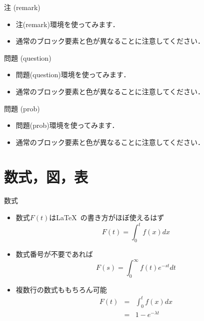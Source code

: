\begin{frame}{注 (remark)}
  \begin{remark}
    \begin{itemize}
      \item 注(remark)環境を使ってみます．
      \item 通常のブロック要素と色が異なることに注意してください．
    \end{itemize}
  \end{remark}
\end{frame}

\begin{frame}{問題 (question)}
  \begin{question}
    \begin{itemize}
      \item 問題(question)環境を使ってみます．
      \item 通常のブロック要素と色が異なることに注意してください．
    \end{itemize}
  \end{question}
\end{frame}

\begin{frame}{問題 (prob)}
  \begin{prob}
    \begin{itemize}
      \item 問題(prob)環境を使ってみます．
      \item 通常のブロック要素と色が異なることに注意してください．
    \end{itemize}
  \end{prob}
\end{frame}

\section{数式，図，表}

\begin{frame}{数式}
  \begin{itemize}
    \item 数式$F(t)$は\LaTeX~の書き方がほぼ使えるはず
    \begin{equation}
      F(t) = \int_{0}^{t}f(x)dx
    \end{equation}
    \item 数式番号が不要であれば
    \begin{equation*}
      F(s) = \int_{0}^{\infty}f(t)e^{-st}dt
    \end{equation*}
    \item 複数行の数式ももちろん可能
    \begin{eqnarray*}
      F(t) &=& \int_{0}^{t}f(x)dx \\
      &=& 1 - e^{-\lambda t}
    \end{eqnarray*}
  \end{itemize}
\end{frame}

